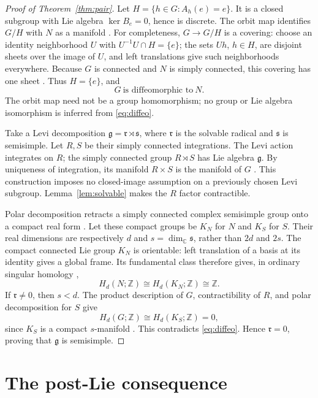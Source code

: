 \documentclass[11pt]{amsart}
\theoremstyle{remark}
\newcommand{\g}{\mathfrak g}
\newcommand{\s}{\mathfrak s}
\newcommand{\rad}{\mathfrak r}
\newcommand{\C}{\mathbb C}
\newcommand{\Z}{\mathbb Z}
\begin{document}
\begin{proof}[Proof of Theorem~\ref{thm:pair}]
Let \(H=\{h\in G:A_h(e)=e\}\).
It is a closed subgroup with Lie algebra
\(\ker B_e=0\), hence is discrete.
The orbit map identifies \(G/H\) with \(N\) as a manifold
\cite[Proposition~4.12 and Corollary~4.16]{Etingof}.
For completeness, \(G\to G/H\) is a covering: choose an identity
neighborhood \(U\) with \(U^{-1}U\cap H=\{e\}\); the sets \(Uh\),
\(h\in H\), are disjoint sheets over the image of \(U\), and left
translations give such neighborhoods everywhere.
Because \(G\) is connected and \(N\) is simply connected, this
covering has one sheet \cite[Proposition~1.32]{Hatcher}.
Thus \(H=\{e\}\), and
\begin{equation}\label{eq:diffeo}
 G\ \text{is diffeomorphic to}\ N .
\end{equation}
The orbit map need not be a group homomorphism; no group or
Lie algebra isomorphism is inferred from \eqref{eq:diffeo}.

Take a Levi decomposition \(\g=\rad\rtimes\s\), where
\(\rad\) is the solvable radical and \(\s\) is semisimple.
Let \(R,S\) be their simply connected integrations.
The Levi action integrates on \(R\); the simply connected group
\(R\rtimes S\) has Lie algebra \(\g\).
By uniqueness of integration, its manifold \(R\times S\) is the
manifold of \(G\)
\cite[Theorem~48.9 and Corollary~9.14]{Etingof}.
This construction imposes no closed-image assumption on a
previously chosen Levi subgroup.  Lemma~\ref{lem:solvable}
makes the \(R\) factor contractible.

Polar decomposition retracts a simply connected complex semisimple
group onto a compact real form
\cite[Corollary~43.5, Theorem~43.7, Corollary~43.8 and the
following covering discussion]{Etingof}.
Let these compact groups be \(K_N\) for \(N\) and \(K_S\) for \(S\).
Their real dimensions are respectively \(d\) and
\(s=\dim_{\C}\s\), rather than \(2d\) and \(2s\).
The compact connected Lie group \(K_N\) is orientable: left
translation of a basis at its identity gives a global frame.
Its fundamental class therefore gives, in ordinary singular homology
\cite[Theorem~3.26(a)]{Hatcher},
\[
 H_d(N;\Z)\cong H_d(K_N;\Z)\cong\Z.
\]
If \(\rad\ne0\), then \(s<d\).
The product description of \(G\), contractibility of \(R\), and polar
decomposition for \(S\) give
\[
 H_d(G;\Z)\cong H_d(K_S;\Z)=0,
\]
since \(K_S\) is a compact \(s\)-manifold
\cite[Theorem~3.26(c)]{Hatcher}.
This contradicts \eqref{eq:diffeo}.
Hence \(\rad=0\), proving that \(\g\) is semisimple.
\end{proof}

\section{The post-Lie consequence}
\end{document}
